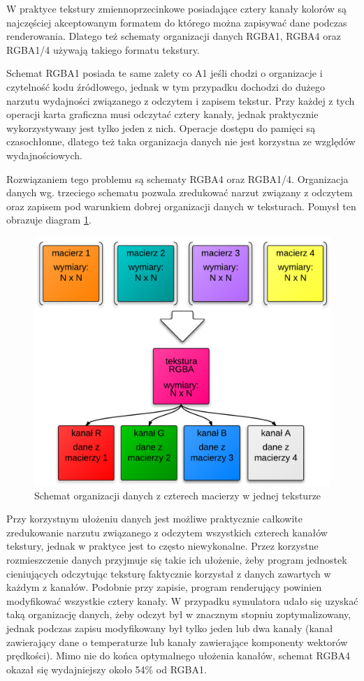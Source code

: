W praktyce tekstury zmiennoprzecinkowe posiadające cztery kanały kolorów są
najczęściej akceptowanym formatem do którego można zapisywać dane podczas
renderowania. Dlatego też schematy organizacji danych RGBA1, RGBA4 oraz RGBA1/4
używają takiego formatu tekstury.

Schemat RGBA1 posiada te same zalety co A1 jeśli chodzi o organizacje i
czytelność kodu źródłowego, jednak w tym przypadku dochodzi do dużego narzutu
wydajności związanego z odczytem i zapisem tekstur. Przy każdej z tych operacji
karta graficzna musi odczytać cztery kanały, jednak praktycznie wykorzystywany
jest tylko jeden z nich. Operacje dostępu do pamięci są czasochłonne, dlatego
też taka organizacja danych nie jest korzystna ze względów wydajnościowych.

Rozwiązaniem tego problemu są schematy RGBA4 oraz RGBA1/4. Organizacja danych
wg. trzeciego schematu pozwala zredukować narzut związany z odczytem oraz
zapisem pod warunkiem dobrej organizacji danych w teksturach. Pomysł ten
obrazuje diagram \ref{fig:rgba4Tex}. 

\begin{figure}[!h]
\centering
\includegraphics[width=.9\textwidth]{img/rgba4Tex}
\caption{Schemat organizacji danych z czterech macierzy w jednej teksturze}
\label{fig:rgba4Tex}
\end{figure}

Przy korzystnym ułożeniu danych jest możliwe praktycznie całkowite zredukowanie
narzutu związanego z odczytem wszystkich czterech kanałów tekstury, jednak w
praktyce jest to często niewykonalne. Przez korzystne rozmieszczenie danych
przyjmuje się takie ich ułożenie, żeby program jednostek cieniujących odczytując
teksturę faktycznie korzystał z danych zawartych w każdym z kanałów. Podobnie
przy zapisie, program renderujący powinien modyfikować wszystkie cztery kanały.
W przypadku symulatora  udało się uzyskać taką organizację danych,
żeby odczyt był w znacznym stopniu zoptymalizowany, jednak podczas zapisu
modyfikowany był tylko jeden lub dwa kanały (kanał zawierający dane o
temperaturze lub kanały zawierające komponenty wektorów prędkości). Mimo nie do
końca optymalnego ułożenia kanałów, schemat RGBA4 okazał się wydajniejszy około
54\% od RGBA1.

